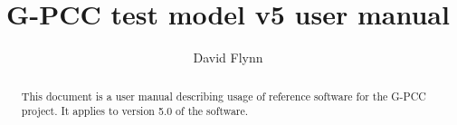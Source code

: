 \documentclass[a4paper,11pt]{mpegdoc}
\title{G-PCC test model v5 user manual}
\author{%
	David Flynn
	\email{dflynn@blackberry.com}
}
\begin{document}
\maketitle
\begin{abstract}
This document is a user manual describing usage of reference software
for the G-PCC project. It applies to version 5.0 of the software.
\end{abstract}

\tableofcontents









%
\end{document}
